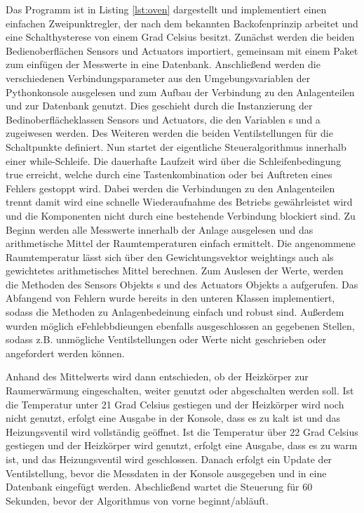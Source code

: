 Das Programm ist in Listing \ref{lst:oven} dargestellt und implementiert einen einfachen Zweipunktregler, der nach dem bekannten Backofenprinzip arbeitet und eine Schalthysterese von einem Grad Celsius besitzt. Zunächst werden die beiden Bedienoberflächen Sensors und Actuators importiert, gemeinsam mit einem Paket zum einfügen der Messwerte in eine Datenbank. Anschließend werden die verschiedenen Verbindungsparameter aus den Umgebungsvariablen der Pythonkonsole ausgelesen und zum Aufbau der Verbindung zu den Anlagenteilen und zur Datenbank genutzt. Dies geschieht durch die Instanzierung der Bedinoberflächeklassen Sensors und Actuators, die den Variablen s und a zugeiwesen werden.
 Des Weiteren werden die beiden Ventilstellungen für die Schaltpunkte definiert. Nun startet der eigentliche Steueralgorithmus innerhalb einer while-Schleife. Die dauerhafte Laufzeit wird über die Schleifenbedingung true erreicht, welche durch eine Tastenkombination oder bei Auftreten eines Fehlers gestoppt wird.
 Dabei werden die Verbindungen zu den Anlagenteilen trennt damit wird eine schnelle Wiederaufnahme des Betriebs gewährleistet wird und die Komponenten nicht durch eine bestehende Verbindung blockiert sind.
Zu Beginn werden alle Messwerte innerhalb der Anlage ausgelesen und das arithmetische Mittel der Raumtemperaturen einfach ermittelt. Die angenommene Raumtemperatur lässt sich über den Gewichtungsvektor weightings auch als gewichtetes arithmetisches Mittel berechnen.
Zum Auslesen der Werte, werden die Methoden des Sensors Objekts s und des Actuators Objekts a aufgerufen.
Das Abfangend von Fehlern wurde bereits in den unteren Klassen implementiert, sodass die Methoden zu Anlagenbedeinung einfach und robust sind. Außerdem wurden möglich eFehlebbdieungen ebenfalls ausgeschlossen an gegebenen Stellen, sodass z.B. unmögliche Ventilstellungen oder Werte nicht geschrieben oder angefordert werden können.

Anhand des Mittelwerts wird dann entschieden, ob der Heizkörper zur Raumerwärmung eingeschalten, weiter genutzt oder abgeschalten werden soll. Ist die Temperatur unter 21 Grad Celsius gestiegen und der Heizkörper wird noch nicht genutzt, erfolgt eine Ausgabe in der Konsole, dass es zu kalt ist und das Heizungsventil wird vollständig geöffnet. Ist die Temperatur über 22 Grad Celsius gestiegen und der Heizkörper wird genutzt, erfolgt eine Ausgabe, dass es zu warm ist, und das Heizungsventil wird geschlossen.
Danach erfolgt ein Update der Ventilstellung, bevor die Messdaten in der Konsole ausgegeben und in eine Datenbank eingefügt werden. Abschließend wartet die Steuerung für 60 Sekunden, bevor der Algorithmus von vorne beginnt/abläuft.

